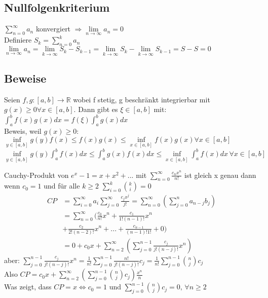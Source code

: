 \documentclass[a4paper,10pt]{article}
\def\limn{\lim\limits_{n\to \infty}}
\def\sumn{\sum\limits_{n=0}^{\infty}}
\def\R{\mathbb{R}}
\begin{document}
\subsection{Nullfolgenkriterium}
\begin{subbox}{}
  $\sumn a_n$ konvergiert $\Rightarrow \limn a_n = 0$\\
  Definiere $S_k = \sum\limits_{n=0}^{k} a_n$\\
  $\limn a_n = \lim\limits_{k\to \infty} S_k - S_{k-1} = \lim\limits_{k\to \infty} S_k - \lim\limits_{k\to \infty} S_{k-1} = S - S = 0$
\end{subbox}

\subsection{Beweise}
\begin{subbox}{}
  Seien $f,g : [a,b] \to \R$ wobei f stetig, g beschränkt integrierbar mit $g(x) \geq 0 \forall x\in[a,b]$. Dann gibt es $\xi \in [a,b]$ mit:\\
  $\int_a^b f(x)g(x)dx = f(\xi)\int_a^b g(x)dx$\\
  Beweis, weil $g(x) \geq 0$:\\
  $\underset{y\in[a,b]}{\inf}g(y)f(x) \leq f(x)g(x) \leq \underset{x\in[a,b]}{\inf} f(x)g(x) \forall x \in [a,b]$\\
  $\underset{y\in[a,b]}{\inf}g(y)\int_a^b f(x)dx \leq \int_a^b g(x)f(x)dx \leq \underset{x\in[a,b]}{\inf} \int_a^b f(x)dx \, \forall x \in [a,b]$
\end{subbox}

\begin{subbox}{}
  Cauchy-Produkt von $e^x - 1 = x + x^2 + ...$ mit $\sumn \frac{c_n x^n}{n!}$ ist gleich x genau dann wenn $c_0=1$ und für alle $k\geq 2$ $\sum\limits_{i=0}^{k}\binom{k}{i} = 0$\\
  \begin{align*}
    CP &= \sum\limits_{i=0}^{\infty}a_i \sum\limits_{j=0}^{\infty}\frac{c_j x^j}{j!} = \sumn(\sum\limits_{j=0}^{n}a_{n-j}b_j)\\
    &= \sumn(\frac{c_0}{n!}x^n + \frac{c_1}{1!(n-1)!}x^n\\
    &+ \frac{c_2}{2!(n-2)!}x^n + ... + \frac{c_{n-1}}{(n-1)!1!} + 0)\\
    &= 0 + c_0x + \sum\limits_{n=2}^{\infty}(\sum\limits_{j=0}^{n-1}\frac{c_j}{j!(n-j)!}x^n)
  \end{align*}
  aber: 
  $\sum\limits_{j=0}^{n-1}\frac{c_j}{j!(n-j)!}x^n = \frac{1}{n!}\sum\limits_{j=0}^{n-1}\frac{n!}{j!(n-j)!}c_j = \frac{1}{n!}\sum\limits_{j=0}^{n-1}\binom{n}{j}c_j$\\
  Also $CP = c_0x + \sum\limits_{n=2}^{\infty}(\sum\limits_{j=0}^{n-1}\binom{n}{j}c_j)\frac{x^n}{n}$\\
  Was zeigt, dass $CP = x \Leftrightarrow c_0 = 1$ und $\sum\limits_{j=0}^{n-1}\binom{n}{j}c_j = 0, \, \forall n\geq 2$
\end{subbox}
\end{document}

